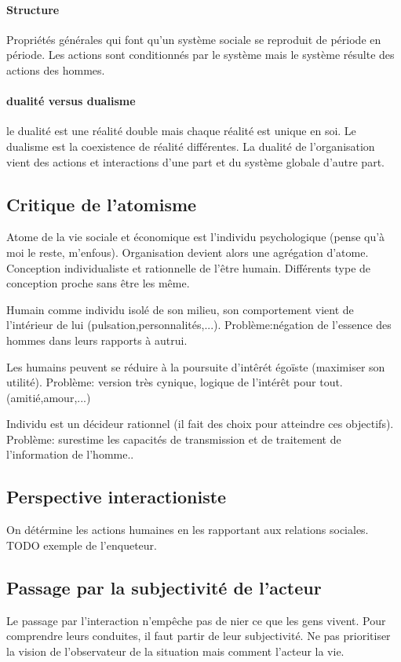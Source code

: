 \documentclass[11pt]{article} %
\begin{document}
		\paragraph{Structure} Propriétés générales qui font qu'un système sociale se reproduit de période en 
		période.
		Les actions sont conditionnés par le système mais le système résulte des actions des hommes.
		\paragraph{dualité versus dualisme} le dualité est une réalité double mais chaque réalité est unique en 	
		soi. Le dualisme est la coexistence de réalité différentes. La dualité de l'organisation vient des actions
		et interactions d'une part et du système globale d'autre part.
	\subsection{Critique de l'atomisme}
		Atome de la vie sociale et économique est l'individu psychologique (pense qu'à moi le reste, 
		m'enfous). 
		Organisation devient alors une agrégation d'atome. Conception individualiste et rationnelle de l'être 
		humain. Différents type de conception proche sans être les même.
		\begin{description}
			\item [Conception monadique:] Humain comme individu isolé de son milieu, son comportement 
			vient de l'intérieur de lui (pulsation,personnalités,...). Problème:négation de l'essence des hommes
			dans leurs rapports à autrui.
			\item[Utilitarisme:] Les humains peuvent se réduire à la poursuite d'intêrét égoïste (maximiser son 
			utilité). Problème: version très cynique, logique de l'intérêt pour tout.(amitié,amour,...)
			\item Individu est un décideur rationnel (il fait des choix pour atteindre ces objectifs). Problème:
			surestime les capacités de transmission et de traitement de l'information de l'homme..
		\end{description}
	\subsection{Perspective interactioniste}
		On détérmine les actions humaines en les rapportant aux relations sociales. TODO exemple de 
		l'enqueteur.
	\subsection{Passage par la subjectivité de l'acteur}
		Le passage par l'interaction n'empêche pas de nier ce que les gens vivent. Pour comprendre leurs 
		conduites, il faut partir de leur subjectivité. Ne pas prioritiser la vision de l'observateur de la situation
		mais comment l'acteur la vie.
\end{document}

